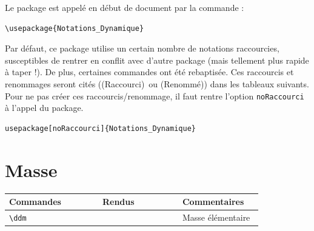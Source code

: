 \documentclass[a4paper,10pt]{article}
\newcommand{\rac}{({\color{red}Raccourci})}
\newcommand{\ren}{({\color{blue}Renommé})}
\begin{document}
	Le package est appelé en début de document par la commande :
	\begin{verbatim}
\usepackage{Notations_Dynamique}
	\end{verbatim}

	Par défaut, ce package utilise un certain nombre de notations raccourcies, susceptibles de rentrer en conflit avec d'autre package (mais tellement plus rapide à taper !).
	De plus, certaines commandes ont été rebaptisée.
	Ces raccourcis et renommages seront cités (\rac\ ou \ren) dans les tableaux suivants.
	Pour ne pas créer ces raccourcis/renommage, il faut rentre l'option \verb!noRaccourci! à l'appel du package.

	\begin{verbatim}
usepackage[noRaccourci]{Notations_Dynamique}
	\end{verbatim}

	\section{Masse}
	\noindent
	\begin{tabular}{|p{0.35\linewidth}|p{0.3\linewidth}|p{0.3\linewidth}|}
		\hline
			\textbf{Commandes}&\textbf{Rendus}&\textbf{Commentaires}
		\\\hline\hline
			\verb!\ddm!			&	\ddm			&	Masse élémentaire
		\\\hline
	\end{tabular}
	
	
\end{document}
